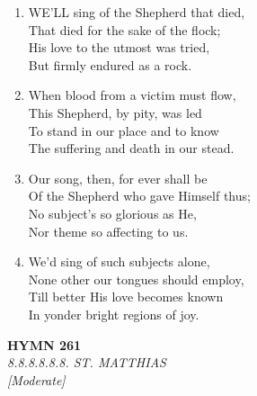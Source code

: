 \documentclass[11pt,a4paper]{article}
\begin{document}
\begin{enumerate}
    \item WE'LL sing of the Shepherd that died, \\
        That died for the sake of the flock; \\
        His love to the utmost was tried, \\
        But firmly endured as a rock.

    \item When blood from a victim must flow, \\
        This Shepherd, by pity, was led \\
        To stand in our place and to know \\
        The suffering and death in our stead.

    \item Our song, then, for ever shall be \\
        Of the Shepherd who gave Himself thus; \\
        No subject's so glorious as He, \\
        Nor theme so affecting to us.

    \item We'd sing of such subjects alone, \\
        None other our tongues should employ, \\
        Till better His love becomes known \\
        In yonder bright regions of joy.

\end{enumerate}

\newpage
\begin{center}
    {\Large \textbf{HYMN 261}}
    \\
    \textit{8.8.8.8.8.8. ST. MATTHIAS}
    \\
    \textit{\small [Moderate]}
\end{center}
\vspace{1em}
\end{document}
